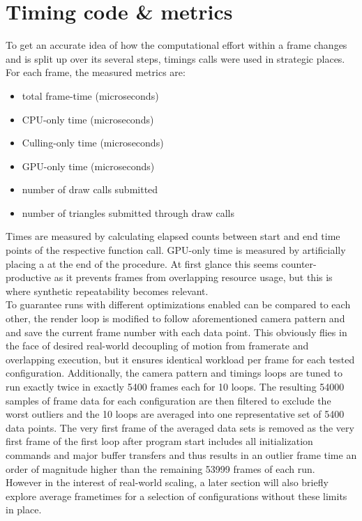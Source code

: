 \section{Timing code \& metrics} \label{bmark_metrics}
To get an accurate idea of how the computational effort within a frame changes and is split up over its several steps,  timings calls were used in strategic places. For each frame, the measured metrics are: \begin{itemize}
\item total frame-time (microseconds)
\item CPU-only time (microseconds)
\item Culling-only time (microseconds)
\item GPU-only time (microseconds)
\item number of draw calls submitted
\item number of triangles submitted through draw calls
\end{itemize}
Times are measured by calculating elapsed counts between start and end time points of the respective function call. GPU-only time is measured by artificially placing a  at the end of the  procedure. At first glance this seems counter-productive as it prevents frames from overlapping resource usage, but this is where synthetic repeatability becomes relevant. \\
To guarantee runs with different optimizations enabled can be compared to each other, the render loop is modified to follow aforementioned camera pattern and and save the current frame number with each data point. This obviously flies in the face of desired real-world decoupling of motion from framerate and overlapping execution, but it ensures identical workload per frame for each tested configuration. Additionally, the camera pattern and timings loops are tuned to run exactly twice in exactly 5400 frames each for 10 loops. The resulting 54000 samples of frame data for each configuration are then filtered to exclude the worst outliers and the 10 loops are averaged into one representative set of 5400 data points. The very first frame of the averaged data sets is removed as the very first frame of the first loop after program start includes all initialization commands and major buffer transfers and thus results in an outlier frame time an order of magnitude higher than the remaining 53999 frames of each run. \\
However in the interest of real-world scaling, a later section will also briefly explore average frametimes for a selection of configurations without these limits in place. \\
